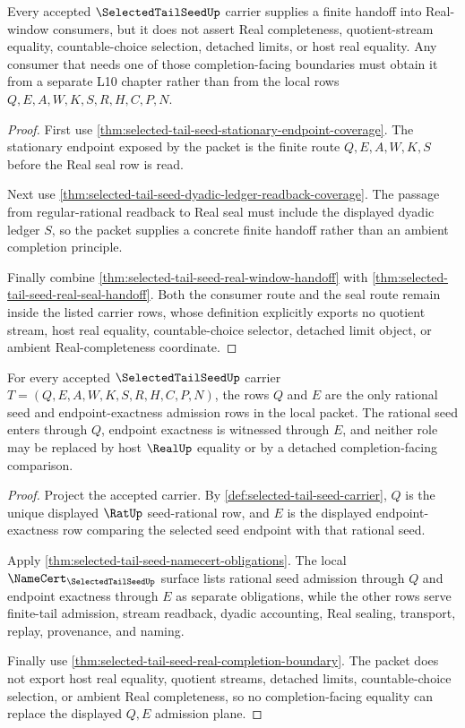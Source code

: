 \begin{theorem}
\label{thm:selected-tail-seed-real-completion-boundary}
Every accepted $\SelectedTailSeedUp$ carrier supplies a finite handoff into Real-window consumers, but it does not assert Real completeness, quotient-stream equality, countable-choice selection, detached limits, or host real equality. Any consumer that needs one of those completion-facing boundaries must obtain it from a separate L10 chapter rather than from the local rows $Q,E,A,W,K,S,R,H,C,P,N$.
\end{theorem}
\begin{proof}
First use \autoref{thm:selected-tail-seed-stationary-endpoint-coverage}. The stationary endpoint exposed by the packet is the finite route $Q,E,A,W,K,S$ before the Real seal row is read.

Next use \autoref{thm:selected-tail-seed-dyadic-ledger-readback-coverage}. The passage from regular-rational readback to Real seal must include the displayed dyadic ledger $S$, so the packet supplies a concrete finite handoff rather than an ambient completion principle.

Finally combine \autoref{thm:selected-tail-seed-real-window-handoff} with \autoref{thm:selected-tail-seed-real-seal-handoff}. Both the consumer route and the seal route remain inside the listed carrier rows, whose definition explicitly exports no quotient stream, host real equality, countable-choice selector, detached limit object, or ambient Real-completeness coordinate.
\end{proof}

\begin{theorem}
\label{thm:selected-tail-seed-rational-seed-admission}
For every accepted $\SelectedTailSeedUp$ carrier $T=(Q,E,A,W,K,S,R,H,C,P,N)$, the rows $Q$ and $E$ are the only rational seed and endpoint-exactness admission rows in the local packet. The rational seed enters through $Q$, endpoint exactness is witnessed through $E$, and neither role may be replaced by host $\RealUp$ equality or by a detached completion-facing comparison.
\end{theorem}
\begin{proof}
Project the accepted carrier. By \autoref{def:selected-tail-seed-carrier}, $Q$ is the unique displayed $\RatUp$ seed-rational row, and $E$ is the displayed endpoint-exactness row comparing the selected seed endpoint with that rational seed.

Apply \autoref{thm:selected-tail-seed-namecert-obligations}. The local $\NameCert_{\SelectedTailSeedUp}$ surface lists rational seed admission through $Q$ and endpoint exactness through $E$ as separate obligations, while the other rows serve finite-tail admission, stream readback, dyadic accounting, Real sealing, transport, replay, provenance, and naming.

Finally use \autoref{thm:selected-tail-seed-real-completion-boundary}. The packet does not export host real equality, quotient streams, detached limits, countable-choice selection, or ambient Real completeness, so no completion-facing equality can replace the displayed $Q,E$ admission plane.
\end{proof}

